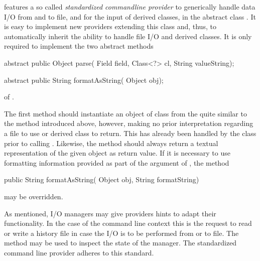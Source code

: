 \alida features a so called {\em standardized commandline provider}
to generically handle data I/O from and to file, and for the input of derived
classes, in the abstract class .
It is easy to implement new providers extending this class and,
thus, to automatically inherit the ability to handle file I/O and derived
classes.
It is only required to implement the two abstract methods
\vspace*{0.5cm}
\begin{code}
  abstract public Object parse( Field field, Class<?> cl, String valueString);

  abstract public String formatAsString( Object obj);
\end{code}

\vspace*{-0.25cm}
of .

The first method should instantiate an object of class  from
the  quite similar to the method 
introduced above, however, making no prior interpretation regarding a file to
use or derived class to return.
This has already been handled by the class 
prior to calling .
Likewise, the method  should always return a textual
representation of the given object as return value.
If it is necessary to use formatting information provided as part of
the argument  of , the method
\vspace*{0.5cm}
\begin{code}
  public String formatAsString( Object obj, String formatString)
\end{code}

\vspace*{-0.25cm}
may be overridden.

As mentioned, I/O managers may give providers hints to adapt their
functionality.
In the case of the command line context this is the request to
read or write a history file in case the I/O is to be performed from or
to file.
The method  may be used to inspect the state of the manager.
The standardized command line provider adheres to this standard.

